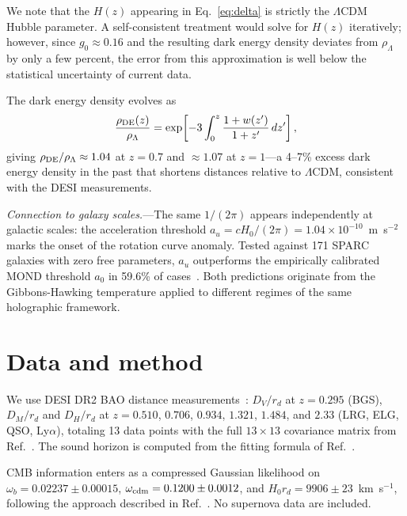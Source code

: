 \documentclass[aps,prl,twocolumn,showpacs,preprintnumbers,amsmath,amssymb,superscriptaddress]{revtex4-2}
\begin{document}
We note that the $H(z)$ appearing in Eq.~\eqref{eq:delta} is 
strictly the $\Lambda$CDM Hubble parameter. A self-consistent 
treatment would solve for $H(z)$ iteratively; however, since 
$g_0 \approx 0.16$ and the resulting dark energy density deviates 
from $\rho_\Lambda$ by only a few percent, the error from this 
approximation is well below the statistical uncertainty of 
current data.

The dark energy density evolves as
\begin{equation}
\frac{\rho_{\rm DE}(z)}{\rho_\Lambda} = 
\exp\!\left[-3\int_0^z \frac{1+w(z')}{1+z'}\,dz'\right],
\label{eq:rhoDE}
\end{equation}
giving $\rho_{\rm DE}/\rho_\Lambda \approx 1.04$ at $z=0.7$ and 
$\approx 1.07$ at $z=1$---a 4--7\% excess dark energy density in 
the past that shortens distances relative to $\Lambda$CDM, consistent 
with the DESI measurements.

\textit{Connection to galaxy scales.}---The same $1/(2\pi)$ appears 
independently at galactic scales: the acceleration threshold 
$a_u = cH_0/(2\pi) = 1.04\times10^{-10}$~m~s$^{-2}$ marks the 
onset of the rotation curve anomaly. Tested against 171 SPARC galaxies 
with zero free parameters, $a_u$ outperforms the empirically calibrated 
MOND threshold $a_0$ in 59.6\% of cases~\cite{Paper1}. Both predictions 
originate from the Gibbons-Hawking temperature applied to different 
regimes of the same holographic framework.

\section{Data and method}

We use DESI DR2 BAO distance measurements~\cite{DESI_DR2}: 
$D_V/r_d$ at $z=0.295$ (BGS), $D_M/r_d$ and $D_H/r_d$ at 
$z = 0.510$, $0.706$, $0.934$, $1.321$, $1.484$, and $2.33$ 
(LRG, ELG, QSO, Ly$\alpha$), totaling 13 data points with the 
full $13 \times 13$ covariance matrix from 
Ref.~\cite{CobayaSampler}. The sound horizon is computed from 
the fitting formula of Ref.~\cite{Aubourg2015}.

CMB information enters as a compressed Gaussian likelihood on 
$\omega_b = 0.02237 \pm 0.00015$, 
$\omega_{\rm cdm} = 0.1200 \pm 0.0012$, and 
$H_0 r_d = 9906 \pm 23$~km~s$^{-1}$, following the approach 
described in Ref.~\cite{DESI_DR2}. No supernova data are included.
\end{document}

